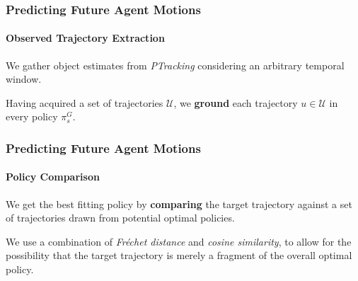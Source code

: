 \begin{frame}
	\frametitle{Predicting Future Agent Motions}
	\framesubtitle{Observed Trajectory Extraction}
	
	\LARGE
	
	\vspace{0.4cm}
	
	We gather object estimates from \emph{PTracking} considering an arbitrary temporal window. \\
	
	\vspace{0.4cm}
	
	Having acquired a set of trajectories $ \mathcal{U} $, we \textbf{ground} each trajectory $ u \in
	\mathcal{U} $ in every policy $ \pi_s^G $. \\
\end{frame}

\begin{frame}
	\frametitle{Predicting Future Agent Motions}
	\framesubtitle{Policy Comparison}
	
	\LARGE
	
	\vspace{0.1cm}
	
	We get the best fitting policy by \textbf{comparing} the target trajectory against a
	set of trajectories drawn from potential optimal policies. \\
	
	\vspace{0.4cm}
	
	We use a combination of \emph{Fr\'echet distance} and \emph{cosine similarity}, to
	allow for the possibility that the target trajectory is merely a fragment of the
	overall optimal policy. \\
\end{frame}

